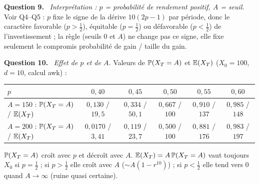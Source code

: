 \documentclass[11pt,a4paper]{article}
\newcommand{\question}[1]{\par\medskip\noindent\textbf{Question #1.}~}
\begin{document}
\begin{exo}
\question{9} \emph{Interprétation : $p$ = probabilité de rendement positif, $A$ = seuil.} Voir Q4--Q5 : $p$ fixe le signe de la dérive
$10(2p-1)$ par période, donc le caractère favorable ($p>\frac12$), équitable ($p=\frac12$) ou défavorable ($p<\frac12$) de l'investissement ;
la règle (seuils $0$ et $A$) ne change pas ce signe, elle fixe seulement le compromis probabilité de gain / taille du gain.

\question{10} \emph{Effet de $p$ et de $A$.} Valeurs de $\mathbb{P}(X_T=A)$ et $\mathbb{E}(X_T)$ ($X_0=100$, $d=10$, calcul awk) :
\begin{center}
\small\begin{tabular}{@{}lccccc@{}}
\toprule
$p$ & $0{,}40$ & $0{,}45$ & $0{,}50$ & $0{,}55$ & $0{,}60$\\\midrule
$A=150$ : $\mathbb{P}(X_T=A)$ / $\mathbb{E}(X_T)$ & $0{,}130$ / $19{,}5$ & $0{,}334$ / $50{,}1$ & $0{,}667$ / $100$ & $0{,}910$ / $137$ & $0{,}985$ / $148$\\
$A=200$ : $\mathbb{P}(X_T=A)$ / $\mathbb{E}(X_T)$ & $0{,}0170$ / $3{,}41$ & $0{,}119$ / $23{,}7$ & $0{,}500$ / $100$ & $0{,}881$ / $176$ & $0{,}983$ / $197$\\\bottomrule
\end{tabular}
\end{center}
\begin{resultat}
$\mathbb{P}(X_T=A)$ croît avec $p$ et décroît avec $A$. $\mathbb{E}(X_T)=A\,\mathbb{P}(X_T=A)$ vaut toujours $X_0$ si $p=\frac12$ ; si $p>\frac12$ elle
croît avec $A$ ($\sim A(1-r^{10})$) ; si $p<\frac12$ elle tend vers $0$ quand $A\to\infty$ (ruine quasi certaine).
\end{resultat}
\end{exo}
\end{document}
